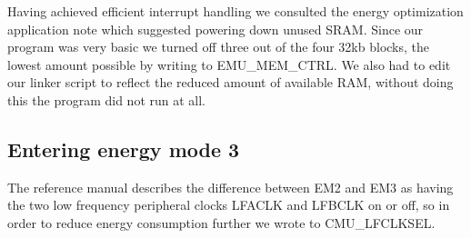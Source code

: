 Having achieved efficient interrupt handling we consulted the energy optimization application note which suggested powering down unused SRAM. Since our program was very basic we turned off three out of the four 32kb blocks, the lowest amount possible by writing to EMU\_MEM\_CTRL. We also had to edit our linker script to reflect the reduced amount of available RAM, without doing this the program did not run at all.

\subsection{Entering energy mode 3}

The reference manual describes the difference between EM2 and EM3 as having the two low frequency peripheral clocks LFACLK and LFBCLK on or off, so in order to reduce energy consumption further we wrote to CMU\_LFCLKSEL.
